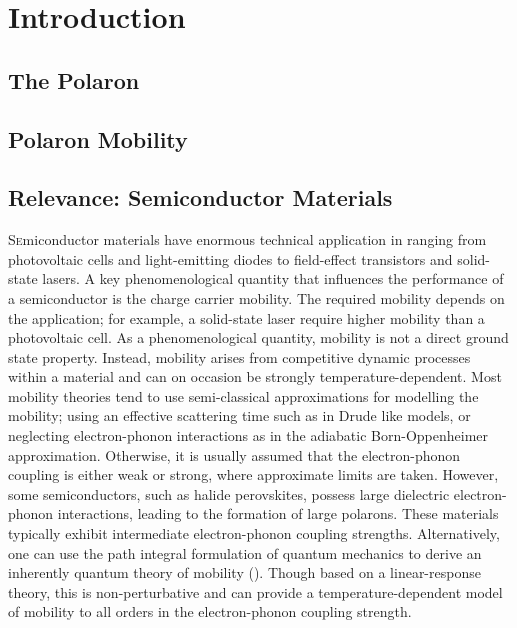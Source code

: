 \clearpage{}

\pagestyle{body}

\chapter{Introduction}
\label{chap:first}



\section{The Polaron}
\label{sec:chap-first-first}

\section{Polaron Mobility}
\label{sec:chap-first-second}

\section{Relevance: Semiconductor Materials}
\label{sec:chap-first-third}

\lettrine{S}emiconductor materials have enormous technical application in ranging from photovoltaic cells and light-emitting diodes to field-effect transistors and solid-state lasers. A key phenomenological quantity that influences the performance of a semiconductor is the charge carrier mobility. The required mobility depends on the application; for example, a solid-state laser require higher mobility than a photovoltaic cell. As a phenomenological quantity, mobility is not a direct ground state property. Instead, mobility arises from competitive dynamic processes within a material and can on occasion be strongly temperature-dependent. Most mobility theories tend to use semi-classical approximations for modelling the mobility; using an effective scattering time such as in Drude like models, or neglecting electron-phonon interactions as in the adiabatic Born-Oppenheimer approximation. Otherwise, it is usually assumed that the electron-phonon coupling is either weak or strong, where approximate limits are taken. However, some semiconductors, such as halide perovskites, possess large dielectric electron-phonon interactions, leading to the formation of large polarons. These materials typically exhibit intermediate electron-phonon coupling strengths. Alternatively, one can use the path integral formulation of quantum mechanics to derive an inherently quantum theory of mobility (\cite{feynman_slow_1955, feynman_mobility_1962}). Though based on a linear-response theory, this is non-perturbative and can provide a temperature-dependent model of mobility to all orders in the electron-phonon coupling strength.